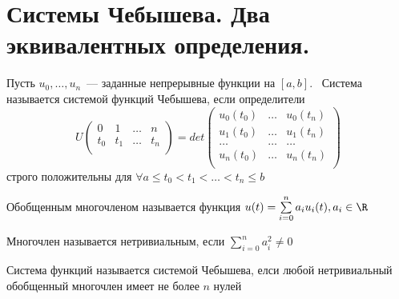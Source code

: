  \section{Системы Чебышева. Два эквивалентных определения.}

 \begin{dfn}
Пусть $u_0, …, u_n$ — заданные непрерывные функции на $[a,b]$.  Система называется системой функций Чебышева, если 
определители
$$U\left(
\begin{array}{cccc}
0 & 1 & … & n \\
t_0 & t_1 & … & t_n\\
\end{array}  \right) = det \left(
\begin{array}{ccc}
u_0(t_0) & … & u_0(t_n) \\
u_1(t_0) & … & u_1(t_n) \\
… & … & … \\
u_n(t_0) & … & u_n(t_n) \\
\end{array}
 \right)
 $$
 строго положительны для $\forall a \leq t_0 < t_1 < … < t_n \leq b$
 \end{dfn}
 \begin{dfn}
Обобщенным многочленом называется функция $u(t) = \sum \limits_{i=0}^n a_iu_i(t), a_i \in \R$
 \end{dfn}

\begin{dfn}
Многочлен называется нетривиальным, если $\sum \limits_{i=0}^n a_i^2 \neq 0$
\end{dfn}

\begin{dfn}
\label{chebSystem2}
Система функций называется системой Чебышева, елси любой нетривиальный обобщенный многочлен имеет не более $n$ нулей
\end{dfn}



\begin{thm}
\label{chebDefEqual}

\end{thm}